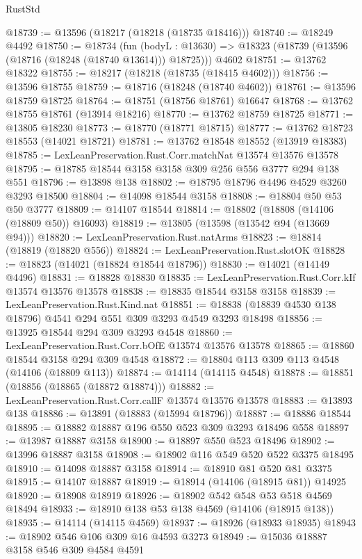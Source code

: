 \begin{lexlean}{RustStd}
\begin{coremodule}
@18739 := @13596 (@18217 (@18218 (@18735 @18416)))
@18740 := @18249 @4492
@18750 := @18734
    (fun (bodyL : @13630) => @18323 (@18739 (@13596 (@18716 (@18248 (@18740 @13614))) @18725)))
    @4602
@18751 := @13762 @18322
@18755 := @18217 (@18218 (@18735 (@18415 @4602)))
@18756 := @13596 @18755
@18759 := @18716 (@18248 (@18740 @4602))
@18761 := @13596 @18759 @18725
@18764 := @18751 (@18756 @18761) @16647
@18768 := @13762 @18755 @18761 (@13914 @18216)
@18770 := @13762 @18759 @18725
@18771 := @13805 @18230
@18773 := @18770 (@18771 @18715)
@18777 := @13762 @18723 @18553 (@14021 @18721)
@18781 := @13762 @18548 @18552 (@13919 @18383)
@18785 := LexLeanPreservation.Rust.Corr.matchNat @13574 @13576 @13578
@18795 := @18785 @18544 @3158 @3158 @309 @256 @556 @3777 @294 @138 @551
@18796 := @13898 @138
@18802 := @18795 @18796 @4496 @4529 @3260 @3293 @18500
@18804 := @14098 @18544 @3158
@18808 := @18804 @50 @53 @50 @3777
@18809 := @14107 @18544
@18814 := @18802 (@18808 (@14106 (@18809 @50)) @16093)
@18819 := @13805 (@13598 (@13542 @94 (@13669 @94)))
@18820 := LexLeanPreservation.Rust.natArms
@18823 := @18814 (@18819 (@18820 @556))
@18824 := LexLeanPreservation.Rust.slotOK
@18828 := @18823 (@14021 (@18824 @18544 @18796))
@18830 := @14021 (@14149 @4496)
@18831 := @18828 @18830
@18835 := LexLeanPreservation.Rust.Corr.kIf @13574 @13576 @13578
@18838 := @18835 @18544 @3158 @3158
@18839 := LexLeanPreservation.Rust.Kind.nat
@18851 := @18838 (@18839 @4530 @138 @18796) @4541 @294 @551 @309 @3293 @4549 @3293 @18498
@18856 := @13925 @18544 @294 @309 @3293 @4548
@18860 := LexLeanPreservation.Rust.Corr.bOfE @13574 @13576 @13578
@18865 := @18860 @18544 @3158 @294 @309 @4548
@18872 := @18804 @113 @309 @113 @4548 (@14106 (@18809 @113))
@18874 := @14114 (@14115 @4548)
@18878 := @18851 (@18856 (@18865 (@18872 @18874)))
@18882 := LexLeanPreservation.Rust.Corr.callF @13574 @13576 @13578
@18883 := @13893 @138
@18886 := @13891 (@18883 (@15994 @18796))
@18887 := @18886 @18544
@18895 := @18882 @18887 @196 @550 @523 @309 @3293 @18496 @558
@18897 := @13987 @18887 @3158
@18900 := @18897 @550 @523 @18496
@18902 := @13996 @18887 @3158
@18908 := @18902 @116 @549 @520 @522 @3375 @18495
@18910 := @14098 @18887 @3158
@18914 := @18910 @81 @520 @81 @3375
@18915 := @14107 @18887
@18919 := @18914 (@14106 (@18915 @81)) @14925
@18920 := @18908 @18919
@18926 := @18902 @542 @548 @53 @518 @4569 @18494
@18933 := @18910 @138 @53 @138 @4569 (@14106 (@18915 @138))
@18935 := @14114 (@14115 @4569)
@18937 := @18926 (@18933 @18935)
@18943 := @18902 @546 @106 @309 @16 @4593 @3273
@18949 := @15036 @18887 @3158 @546 @309 @4584 @4591

\end{coremodule}
\end{lexlean}
